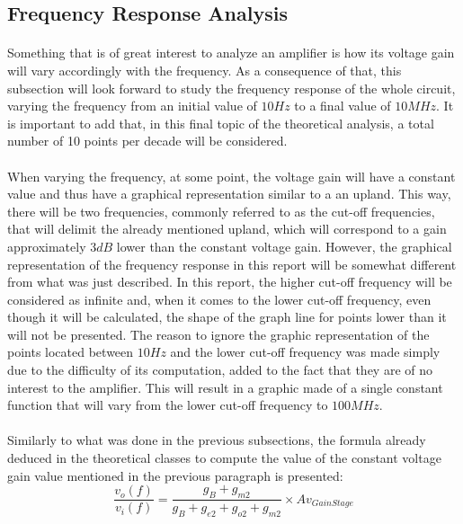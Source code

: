 

\subsection{Frequency Response Analysis}

\paragraph{}Something that is of great interest to analyze an amplifier is how its voltage gain will vary accordingly with the frequency. As a consequence of that, this subsection will look forward to study the frequency response of the whole circuit, varying the frequency from an initial value of $10 Hz$ to a final value of $10 MHz$. It is important to add that, in this final topic of the theoretical analysis, a total number of 10 points per decade will be considered.
\paragraph{}When varying the frequency, at some point, the voltage gain will have a constant value and thus have a graphical representation similar to a an upland. This way, there will be two frequencies, commonly referred to as the cut-off frequencies, that will delimit the already mentioned upland, which will correspond to a gain approximately $3dB$ lower than the constant voltage gain. However, the graphical representation of the frequency response in this report will be somewhat different from what was just described. In this report, the higher cut-off frequency will be considered as infinite and, when it comes to the lower cut-off frequency, even though it will be calculated, the shape of the graph line for points lower than it will not be presented. The reason to ignore the graphic representation of the points located between $10Hz$ and the lower cut-off frequency was made simply due to the difficulty of its computation, added to the fact that they are of no interest to the amplifier. This will result in a graphic made of a single constant function that will vary from the lower cut-off frequency to $100MHz$.  
\paragraph{}Similarly to what was done in the previous subsections, the formula already deduced in the theoretical classes to compute the value of the constant voltage gain value mentioned in the previous paragraph is presented:
\begin{equation}	
    \frac{v_o(f)}{v_i(f)}=\frac{g_B+g_{m2}}{g_B+g_{e2}+g_{o2}+g_{m2}}\times Av_{Gain Stage} 	
\end{equation}
